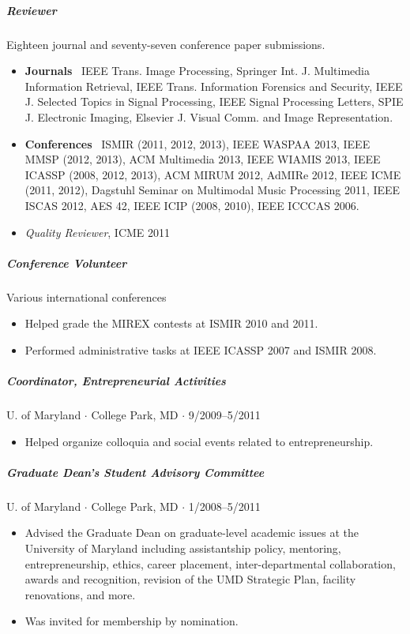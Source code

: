 \documentclass[10pt,letterpaper]{article}
\begin{document}
\subparagraph{Reviewer} Eighteen journal and seventy-seven conference paper submissions. 
\begin{itemize}
    \item \textbf{Journals} \ 
        IEEE Trans. Image Processing, %
        Springer Int. J. Multimedia Information Retrieval, %
        IEEE Trans. Information Forensics and Security, %
        IEEE J. Selected Topics in Signal Processing, %
        IEEE Signal Processing Letters, %
        SPIE J. Electronic Imaging, %
        Elsevier J. Visual Comm. and Image Representation. %
    \item \textbf{Conferences} \ 
        ISMIR (2011, 2012, 2013), %
        IEEE WASPAA 2013, %
        IEEE MMSP (2012, 2013), %
        ACM Multimedia 2013, %
        IEEE WIAMIS 2013, %
        IEEE ICASSP (2008, 2012, 2013), %
        ACM MIRUM 2012, %
        AdMIRe 2012, %
        IEEE ICME (2011, 2012), %
        Dagstuhl Seminar on Multimodal Music Processing 2011, %
        IEEE ISCAS 2012, %
        AES 42, %
        IEEE ICIP (2008, 2010), %
        IEEE ICCCAS 2006. %
    \item \textit{Quality Reviewer}, ICME 2011
\end{itemize}

\subparagraph{Conference Volunteer}
Various international conferences
\begin{itemize}
    \item Helped grade the MIREX contests at ISMIR 2010 and 2011.
    \item Performed administrative tasks at IEEE ICASSP 2007 and ISMIR 2008.
\end{itemize}

\subparagraph{Coordinator, Entrepreneurial Activities}
U. of Maryland $\cdot$ College Park, MD $\cdot$ 9/2009--5/2011
\begin{itemize}
    \item Helped organize colloquia and social events related to entrepreneurship.
\end{itemize}

\subparagraph{Graduate Dean's Student Advisory Committee}
U. of Maryland $\cdot$ College Park, MD $\cdot$ 1/2008--5/2011
\begin{itemize}
    \item Advised the Graduate Dean on graduate-level academic issues at the University of Maryland including assistantship policy, mentoring, entrepreneurship, ethics, career placement, inter-departmental collaboration, awards and recognition, revision of the UMD Strategic Plan, facility renovations, and more.
    \item Was invited for membership by nomination.
\end{itemize}
\end{document}
